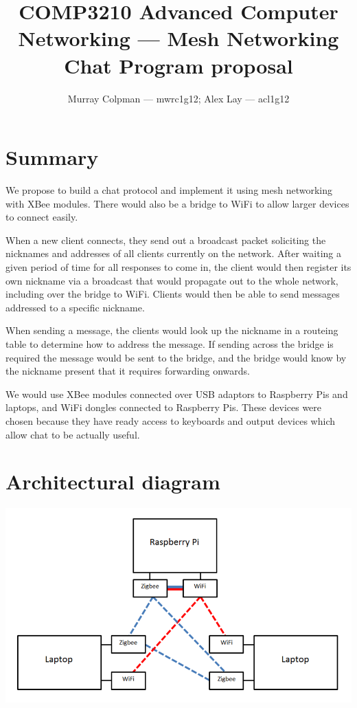 \documentclass[a4paper,12pt]{article}
\title{COMP3210 Advanced Computer Networking --- Mesh Networking Chat Program
proposal}
\author{Murray Colpman --- mwrc1g12; Alex Lay --- acl1g12}
\begin{document}
\maketitle

\section{Summary}

We propose to build a chat protocol and implement it using mesh networking with
XBee modules. There would also be a bridge to WiFi to allow larger devices to
connect easily.

When a new client connects, they send out a broadcast packet soliciting the
nicknames and addresses of all clients currently on the network. After waiting
a given period of time for all responses to come in, the client would then
register its own nickname via a broadcast that would propagate out to the whole
network, including over the bridge to WiFi. Clients would then be able to send
messages addressed to a specific nickname.

When sending a message, the clients would look up the nickname in a routeing
table to determine how to address the message. If sending across the bridge is
required the message would be sent to the bridge, and the bridge would know by
the nickname present that it requires forwarding onwards.

We would use XBee modules connected over USB adaptors to Raspberry Pis and
laptops, and WiFi dongles connected to Raspberry Pis. These devices were chosen
because they have ready access to keyboards and output devices which allow chat
to be actually useful.

\section{Architectural diagram}

\includegraphics[width=\textwidth]{architectural-diagram}
\end{document}
